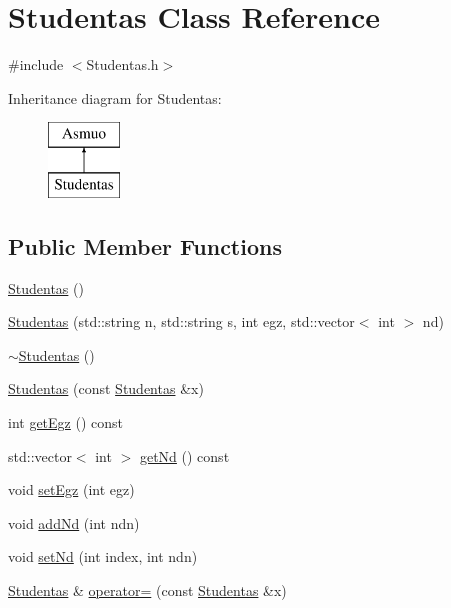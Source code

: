\hypertarget{class_studentas}{}\section{Studentas Class Reference}
\label{class_studentas}


{\ttfamily \#include $<$Studentas.\+h$>$}

Inheritance diagram for Studentas\+:\begin{figure}[H]
\begin{center}
\leavevmode
\includegraphics[height=2.000000cm]{class_studentas}
\end{center}
\end{figure}
\subsection*{Public Member Functions}
\begin{DoxyCompactItemize}
\item 
\mbox{\hyperlink{class_studentas_ab459e995e8c9b24cdc9aec5b09a66539}{Studentas}} ()
\item 
\mbox{\hyperlink{class_studentas_a16954773ebaae3c8e5359a7c52564775}{Studentas}} (std\+::string n, std\+::string s, int egz, std\+::vector$<$ int $>$ nd)
\item 
\mbox{\hyperlink{class_studentas_a63e449e0f51a0b14340d02ee71b4be23}{$\sim$\+Studentas}} ()
\item 
\mbox{\hyperlink{class_studentas_a9d9605513c1581cb856b1371dd35d89a}{Studentas}} (const \mbox{\hyperlink{class_studentas}{Studentas}} \&x)
\item 
int \mbox{\hyperlink{class_studentas_a2f9dcb2fef2e6b3dbc1581779a90a68a}{get\+Egz}} () const
\item 
std\+::vector$<$ int $>$ \mbox{\hyperlink{class_studentas_a35a27fb46249e2630dc6836e4b7e06eb}{get\+Nd}} () const
\item 
void \mbox{\hyperlink{class_studentas_ad7097a9d0431a41a0f0f63770ef6559d}{set\+Egz}} (int egz)
\item 
void \mbox{\hyperlink{class_studentas_ab888052467143abd3af75d36c147740a}{add\+Nd}} (int ndn)
\item 
void \mbox{\hyperlink{class_studentas_a72f6b025786c2d5528521404bc76fc7d}{set\+Nd}} (int index, int ndn)
\item 
\mbox{\hyperlink{class_studentas}{Studentas}} \& \mbox{\hyperlink{class_studentas_a93171a6fec0d88ce51ed1881da18ab1b}{operator=}} (const \mbox{\hyperlink{class_studentas}{Studentas}} \&x)
\end{DoxyCompactItemize}
